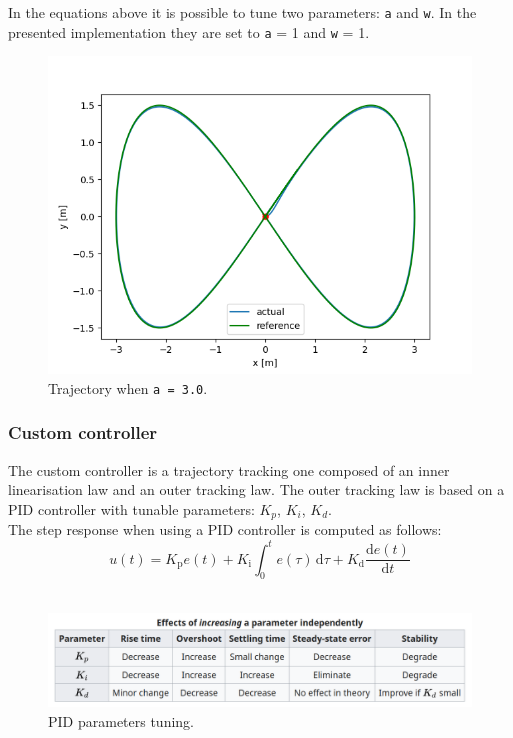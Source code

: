 \documentclass[11pt,a4paper]{article}
\begin{document}
In the equations above it is possible to tune two parameters: \texttt{a} and \texttt{w}.
In the presented implementation they are set to \texttt{a} = 1 and \texttt{w} = 1.

\begin{figure}[H]
    \centering
    \includegraphics[scale=0.5]{different_params/custom_a3/Trajectory.png}
    \caption{Trajectory when \texttt{a = 3.0}.}
\end{figure}

\subsubsection{Custom controller}

The custom controller is a trajectory tracking one composed of an inner linearisation law and an outer tracking law.
The outer tracking law is based on a PID controller with tunable parameters: $K_p$, $K_i$, $K_d$.\\

The step response when using a PID controller is computed as follows:
$$ {\displaystyle u(t)=K_{\text{p}}e(t)+K_{\text{i}}\int _{0}^{t}e(\tau )\,\mathrm {d} \tau +K_{\text{d}}{\frac {\mathrm {d} e(t)}{\mathrm {d} t}}} $$\\

\begin{figure}[H]
    \centering
    \includegraphics[scale=0.4]{other/PID_parameters_description.png}
    \caption{PID parameters tuning.}
\end{figure}
\end{document}
